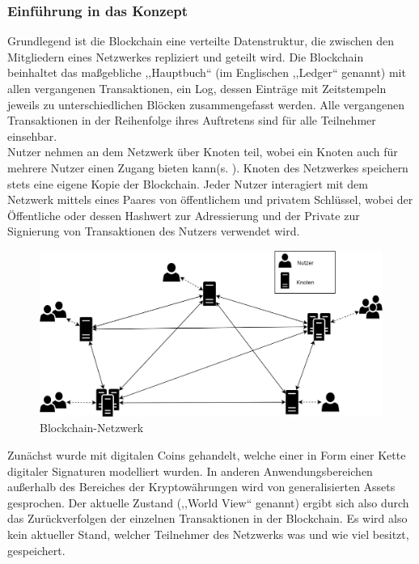     \subsubsection{Einführung in das Konzept}
    \label{sec:sota_blockchain_introduction}
    Grundlegend ist die Blockchain eine verteilte Datenstruktur, die zwischen den Mitgliedern eines Netzwerkes repliziert und geteilt wird\cite{Christidis2016}.
    Die Blockchain beinhaltet das maßgebliche ,,Hauptbuch`` (im Englischen ,,Ledger`` genannt) mit allen vergangenen Transaktionen, ein Log, dessen Einträge mit Zeitstempeln jeweils zu unterschiedlichen Blöcken zusammengefasst werden. 
    Alle vergangenen Transaktionen in der Reihenfolge ihres Auftretens sind für alle Teilnehmer einsehbar\cite{Nakamoto2008}.
    \medskip\\
    Nutzer nehmen an dem Netzwerk über Knoten teil, wobei ein Knoten auch für mehrere Nutzer einen Zugang bieten kann(s. ). 
    Knoten des Netzwerkes speichern stets eine eigene Kopie der Blockchain.
    Jeder Nutzer interagiert mit dem Netzwerk mittels eines Paares von öffentlichem und privatem Schlüssel, wobei der Öffentliche oder dessen Hashwert zur Adressierung und der Private zur Signierung von Transaktionen des Nutzers verwendet wird.\cite{Christidis2016}
    \begin{figure}[H]
    	\centering
    	\includegraphics[width=\textwidth]{graphics/BCNetwork.png}
    	\caption[Blockchain-Netzwerk]{Blockchain-Netzwerk}
    	\label{fig:bc_network}
    \end{figure}
    
    Zunächst wurde mit digitalen Coins gehandelt, welche einer in Form einer Kette digitaler Signaturen modelliert wurden\cite{Nakamoto2008}.
    In anderen Anwendungsbereichen außerhalb des Bereiches der Kryptowährungen wird von generalisierten Assets gesprochen.
    Der aktuelle Zustand (,,World View`` genannt) ergibt sich also durch das Zurückverfolgen der einzelnen Transaktionen in der Blockchain. 
    Es wird also kein aktueller Stand, welcher Teilnehmer des Netzwerks was und wie viel besitzt, gespeichert.\cite{Christidis2016}
    

